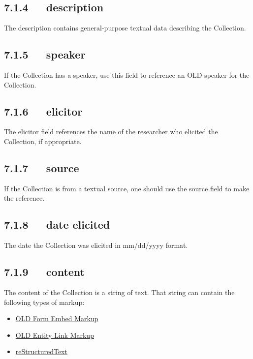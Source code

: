 \documentclass[letterpaper,10pt,english]{sphinxmanual}
\begin{document}
\subsection{7.1.4   description}
\label{user_guide:id12}
The description contains general-purpose textual data describing the Collection.


\subsection{7.1.5   speaker}
\label{user_guide:id13}
If the Collection has a speaker, use this field to reference an OLD speaker for
the Collection.


\subsection{7.1.6   elicitor}
\label{user_guide:id14}
The elicitor field references the name of the researcher who elicited the
Collection, if appropriate.


\subsection{7.1.7   source}
\label{user_guide:id15}
If the Collection is from a textual source, one should use the source field to
make the reference.


\subsection{7.1.8   date elicited}
\label{user_guide:id16}
The date the Collection was elicited in mm/dd/yyyy format.


\subsection{7.1.9   content}
\label{user_guide:content}
The content of the Collection is a string of text.  That string can contain the
following types of markup:
\begin{itemize}
\item {} 
{\hyperref[user_guide:old-form-embed-markup]{OLD Form Embed Markup}}

\item {} 
{\hyperref[user_guide:old-entity-link-markup]{OLD Entity Link Markup}}

\item {} 
{\hyperref[user_guide:restructuredtext]{reStructuredText}}

\end{itemize}
\end{document}
